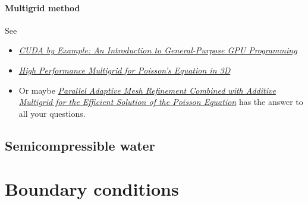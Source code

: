 \paragraph{Multigrid method}

See
\begin{itemize}
    \item \textit{\href{http://developer.download.nvidia.com/books/cuda-by-example/cuda-by-example-sample.pdf}{CUDA by Example: An Introduction to General-Purpose GPU Programming}}
    \item \textit{\href{http://people.freebsd.org/~snb/school/hp_mg.pdf}{High Performance Multigrid for Poisson's Equation in 3D}}
    \item Or maybe \textit{\href{http://downloads.isrn.com/journals/appmath/2012/246491.pdf}{Parallel Adaptive Mesh Refinement Combined with Additive Multigrid for the Efficient Solution of the Poisson Equation}} has the answer to all your questions.
\end{itemize}


\subsection{Semicompressible water}

\section{Boundary conditions}